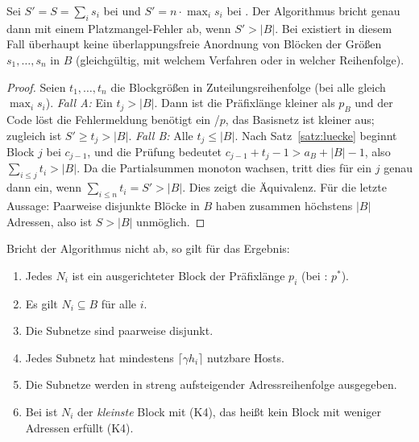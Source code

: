 \begin{satz}
\label{satz:existenz}
	Sei $S' = S = \sum_i s_i$ bei  und $S' = n\cdot \max_i s_i$ bei . Der Algorithmus bricht genau dann mit einem Platzmangel-Fehler ab, wenn $S' > |B|$. Bei  existiert in diesem Fall überhaupt keine überlappungsfreie Anordnung von Blöcken der Größen $s_1,\ldots,s_n$ in $B$ (gleichgültig, mit welchem Verfahren oder in welcher Reihenfolge).
\end{satz}

\begin{proof}
	Seien $t_1,\ldots,t_n$ die Blockgrößen in Zuteilungsreihenfolge (bei  alle gleich $\max_i s_i$). \emph{Fall A:} Ein $t_j > |B|$. Dann ist die Präfixlänge kleiner als $p_B$ und der Code löst die Fehlermeldung \glqq benötigt ein /$p$, das Basisnetz ist kleiner\grqq{} aus; zugleich ist $S' \ge t_j > |B|$. \emph{Fall B:} Alle $t_j \le |B|$. Nach Satz~\ref{satz:luecke} beginnt Block $j$ bei $c_{j-1}$, und die Prüfung  bedeutet $c_{j-1} + t_j - 1 > a_B + |B| - 1$, also $\sum_{i\le j} t_i > |B|$. Da die Partialsummen monoton wachsen, tritt dies für ein $j$ genau dann ein, wenn $\sum_{i\le n} t_i = S' > |B|$. Dies zeigt die Äquivalenz. Für die letzte Aussage: Paarweise disjunkte Blöcke in $B$ haben zusammen höchstens $|B|$ Adressen, also ist $S > |B|$ unmöglich.
\end{proof}

\begin{satz}
\label{satz:korrekt}
	Bricht der Algorithmus nicht ab, so gilt für das Ergebnis:
	\begin{enumerate}[label=(K\arabic*)]
		\item Jedes $N_i$ ist ein ausgerichteter Block der Präfixlänge $p_i$ (bei : $p^*$).
		\item Es gilt $N_i \subseteq B$ für alle $i$.
		\item Die Subnetze sind paarweise disjunkt.
		\item Jedes Subnetz hat mindestens $\lceil \gamma h_i \rceil$ nutzbare Hosts.
		\item Die Subnetze werden in streng aufsteigender Adressreihenfolge ausgegeben.
		\item Bei  ist $N_i$ der \emph{kleinste} Block mit (K4), das heißt kein Block mit weniger Adressen erfüllt (K4).
	\end{enumerate}
\end{satz}

